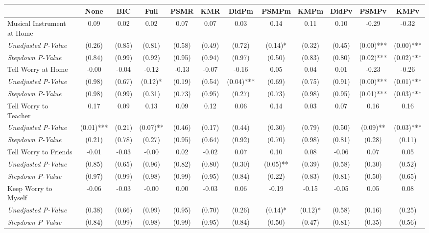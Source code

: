 \begin{tabular}{l c c c c c c c c c c c}
\toprule
 & None & BIC & Full & PSMR & KMR & DidPm & PSMPm & KMPm & DidPv & PSMPv & KMPv \\
\midrule
Musical Instrument at Home & 0.09 & 0.02 & 0.02 & 0.07 & 0.07 & 0.03 & 0.14 & 0.11 & 0.10 & -0.29 & -0.32 \\
\quad \textit{Unadjusted P-Value} & (0.26) & (0.85) & (0.81) & (0.58) & (0.49) & (0.72) & (0.14)* & (0.32) & (0.45) & (0.00)*** & (0.00)*** \\
\quad \textit{Stepdown P-Value} & (0.84) & (0.99) & (0.92) & (0.95) & (0.94) & (0.97) & (0.50) & (0.83) & (0.80) & (0.02)*** & (0.02)*** \\
Tell Worry at Home & -0.00 & -0.04 & -0.12 & -0.13 & -0.07 & -0.16 & 0.05 & 0.04 & 0.01 & -0.23 & -0.26 \\
\quad \textit{Unadjusted P-Value} & (0.98) & (0.67) & (0.12)* & (0.19) & (0.54) & (0.04)*** & (0.69) & (0.75) & (0.91) & (0.00)*** & (0.01)*** \\
\quad \textit{Stepdown P-Value} & (0.98) & (0.99) & (0.31) & (0.73) & (0.95) & (0.27) & (0.73) & (0.98) & (0.95) & (0.01)*** & (0.03)*** \\
Tell Worry to Teacher & 0.17 & 0.09 & 0.13 & 0.09 & 0.12 & 0.06 & 0.14 & 0.03 & 0.07 & 0.16 & 0.16 \\
\quad \textit{Unadjusted P-Value} & (0.01)*** & (0.21) & (0.07)** & (0.46) & (0.17) & (0.44) & (0.30) & (0.79) & (0.50) & (0.09)** & (0.03)*** \\
\quad \textit{Stepdown P-Value} & (0.21) & (0.78) & (0.27) & (0.95) & (0.64) & (0.92) & (0.70) & (0.98) & (0.81) & (0.28) & (0.11) \\
Tell Worry to Friends & -0.01 & -0.03 & -0.00 & 0.02 & -0.02 & 0.07 & 0.10 & 0.08 & -0.06 & 0.07 & 0.05 \\
\quad \textit{Unadjusted P-Value} & (0.85) & (0.65) & (0.96) & (0.82) & (0.80) & (0.30) & (0.05)** & (0.39) & (0.58) & (0.30) & (0.52) \\
\quad \textit{Stepdown P-Value} & (0.97) & (0.99) & (0.98) & (0.99) & (0.95) & (0.84) & (0.22) & (0.83) & (0.81) & (0.50) & (0.65) \\
Keep Worry to Myself & -0.06 & -0.03 & -0.00 & 0.00 & -0.03 & 0.06 & -0.19 & -0.15 & -0.05 & 0.05 & 0.08 \\
\quad \textit{Unadjusted P-Value} & (0.38) & (0.66) & (0.99) & (0.95) & (0.70) & (0.26) & (0.14)* & (0.12)* & (0.58) & (0.16) & (0.25) \\
\quad \textit{Stepdown P-Value} & (0.84) & (0.99) & (0.98) & (0.99) & (0.95) & (0.84) & (0.50) & (0.47) & (0.81) & (0.35) & (0.56) \\

\end{tabular}
